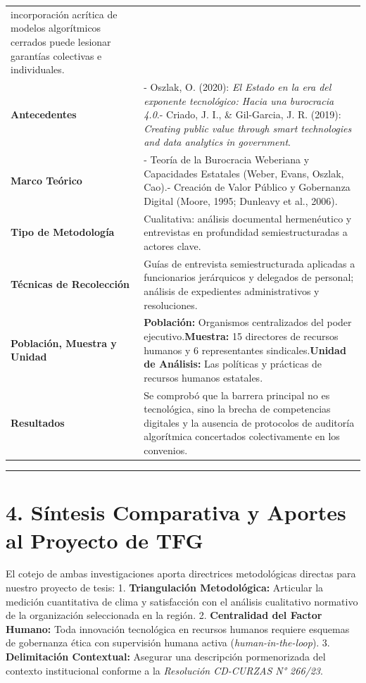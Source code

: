 \documentclass[
  spanish,
  letterpaper,
  DIV=11,
  numbers=noendperiod]{scrartcl}
\begin{document}
{\begin{longtable}[]{@{}
  >{\raggedright\arraybackslash}p{}
  >{\raggedright\arraybackslash}p{}@{}}
incorporación acrítica de modelos algorítmicos cerrados puede lesionar
garantías colectivas e individuales. \\
\textbf{Antecedentes} & - Oszlak, O. (2020): \emph{El Estado en la era
del exponente tecnológico: Hacia una burocracia 4.0}.- Criado, J. I., \&
Gil-Garcia, J. R. (2019): \emph{Creating public value through smart
technologies and data analytics in government}. \\
\textbf{Marco Teórico} & - Teoría de la Burocracia Weberiana y
Capacidades Estatales (Weber, Evans, Oszlak, Cao).- Creación de Valor
Público y Gobernanza Digital (Moore, 1995; Dunleavy et al., 2006). \\
\textbf{Tipo de Metodología} & Cualitativa: análisis documental
hermenéutico y entrevistas en profundidad semiestructuradas a actores
clave. \\
\textbf{Técnicas de Recolección} & Guías de entrevista semiestructurada
aplicadas a funcionarios jerárquicos y delegados de personal; análisis
de expedientes administrativos y resoluciones. \\
\textbf{Población, Muestra y Unidad} & \textbf{Población:} Organismos
centralizados del poder ejecutivo.\textbf{Muestra:} 15 directores de
recursos humanos y 6 representantes sindicales.\textbf{Unidad de
Análisis:} Las políticas y prácticas de recursos humanos estatales. \\
\textbf{Resultados} & Se comprobó que la barrera principal no es
tecnológica, sino la brecha de competencias digitales y la ausencia de
protocolos de auditoría algorítmica concertados colectivamente en los
convenios. \\
\end{longtable}
}

\begin{center}\rule{0.5\linewidth}{0.5pt}\end{center}

\section{4. Síntesis Comparativa y Aportes al Proyecto de
TFG}\label{suxedntesis-comparativa-y-aportes-al-proyecto-de-tfg}

El cotejo de ambas investigaciones aporta directrices metodológicas
directas para nuestro proyecto de tesis: 1. \textbf{Triangulación
Metodológica:} Articular la medición cuantitativa de clima y
satisfacción con el análisis cualitativo normativo de la organización
seleccionada en la región. 2. \textbf{Centralidad del Factor Humano:}
Toda innovación tecnológica en recursos humanos requiere esquemas de
gobernanza ética con supervisión humana activa
(\emph{human-in-the-loop}). 3. \textbf{Delimitación Contextual:}
Asegurar una descripción pormenorizada del contexto institucional
conforme a la \emph{Resolución CD-CURZAS N° 266/23}.
\end{document}
